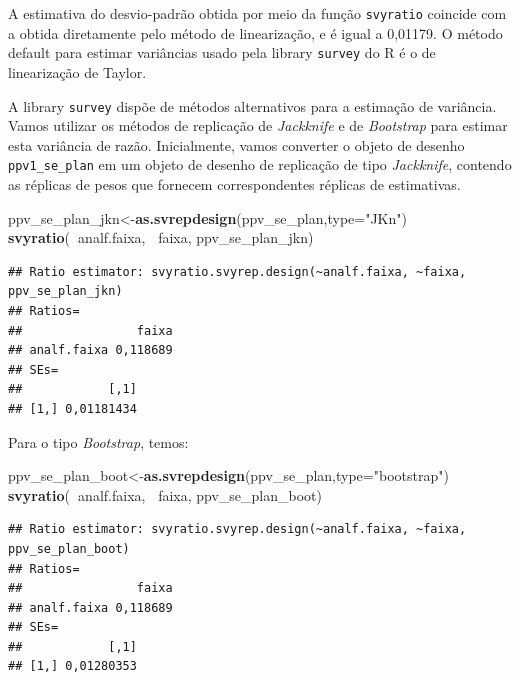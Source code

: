 \documentclass[]{book}
\newenvironment{Shaded}{\begin{snugshade}}{\end{snugshade}}
\newcommand{\KeywordTok}[1]{\textcolor[rgb]{0.13,0.29,0.53}{\textbf{#1}}}
\newcommand{\DataTypeTok}[1]{\textcolor[rgb]{0.13,0.29,0.53}{#1}}
\newcommand{\StringTok}[1]{\textcolor[rgb]{0.31,0.60,0.02}{#1}}
\newcommand{\OperatorTok}[1]{\textcolor[rgb]{0.81,0.36,0.00}{\textbf{#1}}}
\newcommand{\NormalTok}[1]{#1}
\theoremstyle{definition}
\theoremstyle{definition}
\theoremstyle{definition}
\theoremstyle{remark}
\begin{document}
A estimativa do desvio-padrão obtida por meio da função
\texttt{svyratio} coincide com a obtida diretamente pelo método de
linearização, e é igual a 0,01179. O método default para estimar
variâncias usado pela library \texttt{survey} \citep{R-survey} do R é o
de linearização de Taylor.

A library \texttt{survey} dispõe de métodos alternativos para a
estimação de variância. Vamos utilizar os métodos de replicação de
\emph{Jackknife} e de \emph{Bootstrap} para estimar esta variância de
razão. Inicialmente, vamos converter o objeto de desenho
\texttt{ppv1\_se\_plan} em um objeto de desenho de replicação de tipo
\emph{Jackknife}, contendo as réplicas de pesos que fornecem
correspondentes réplicas de estimativas.

\begin{Shaded}
\begin{Highlighting}[]
\NormalTok{ppv_se_plan_jkn<-}\KeywordTok{as.svrepdesign}\NormalTok{(ppv_se_plan,}\DataTypeTok{type=}\StringTok{"JKn"}\NormalTok{)}
\KeywordTok{svyratio}\NormalTok{(}\OperatorTok{~}\NormalTok{analf.faixa, }\OperatorTok{~}\NormalTok{faixa, ppv_se_plan_jkn)}
\end{Highlighting}
\end{Shaded}

\begin{verbatim}
## Ratio estimator: svyratio.svyrep.design(~analf.faixa, ~faixa, ppv_se_plan_jkn)
## Ratios=
##                faixa
## analf.faixa 0,118689
## SEs=
##            [,1]
## [1,] 0,01181434
\end{verbatim}

Para o tipo \emph{Bootstrap}, temos:

\begin{Shaded}
\begin{Highlighting}[]
\NormalTok{ppv_se_plan_boot<-}\KeywordTok{as.svrepdesign}\NormalTok{(ppv_se_plan,}\DataTypeTok{type=}\StringTok{"bootstrap"}\NormalTok{)}
\KeywordTok{svyratio}\NormalTok{(}\OperatorTok{~}\NormalTok{analf.faixa, }\OperatorTok{~}\NormalTok{faixa, ppv_se_plan_boot)}
\end{Highlighting}
\end{Shaded}

\begin{verbatim}
## Ratio estimator: svyratio.svyrep.design(~analf.faixa, ~faixa, ppv_se_plan_boot)
## Ratios=
##                faixa
## analf.faixa 0,118689
## SEs=
##            [,1]
## [1,] 0,01280353
\end{verbatim}
\end{document}
